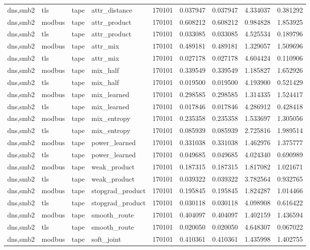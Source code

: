 \begin{tabular}{lllllllll}
dns,smb2 & tls & tape & attr\_distance & 170101 & 0.037947 & 0.037947 & 4.334037 & 0.381292 \\
dns,smb2 & modbus & tape & attr\_product & 170101 & 0.608212 & 0.608212 & 0.984828 & 1.853925 \\
dns,smb2 & tls & tape & attr\_product & 170101 & 0.033085 & 0.033085 & 4.525534 & 0.189796 \\
dns,smb2 & modbus & tape & attr\_mix & 170101 & 0.489181 & 0.489181 & 1.329057 & 1.509696 \\
dns,smb2 & tls & tape & attr\_mix & 170101 & 0.027178 & 0.027178 & 4.604424 & 0.110906 \\
dns,smb2 & modbus & tape & mix\_half & 170101 & 0.339549 & 0.339549 & 1.185827 & 1.652926 \\
dns,smb2 & tls & tape & mix\_half & 170101 & 0.019500 & 0.019500 & 4.193900 & 0.521429 \\
dns,smb2 & modbus & tape & mix\_learned & 170101 & 0.298585 & 0.298585 & 1.314335 & 1.524417 \\
dns,smb2 & tls & tape & mix\_learned & 170101 & 0.017846 & 0.017846 & 4.286912 & 0.428418 \\
dns,smb2 & modbus & tape & mix\_entropy & 170101 & 0.235358 & 0.235358 & 1.533697 & 1.305056 \\
dns,smb2 & tls & tape & mix\_entropy & 170101 & 0.085939 & 0.085939 & 2.725816 & 1.989514 \\
dns,smb2 & modbus & tape & power\_learned & 170101 & 0.331038 & 0.331038 & 1.462976 & 1.375777 \\
dns,smb2 & tls & tape & power\_learned & 170101 & 0.049685 & 0.049685 & 4.024340 & 0.690989 \\
dns,smb2 & modbus & tape & weak\_product & 170101 & 0.187315 & 0.187315 & 1.817082 & 1.021671 \\
dns,smb2 & tls & tape & weak\_product & 170101 & 0.039322 & 0.039322 & 3.782564 & 0.932765 \\
dns,smb2 & modbus & tape & stopgrad\_product & 170101 & 0.195845 & 0.195845 & 1.824287 & 1.014466 \\
dns,smb2 & tls & tape & stopgrad\_product & 170101 & 0.030118 & 0.030118 & 4.098908 & 0.616422 \\
dns,smb2 & modbus & tape & smooth\_route & 170101 & 0.404097 & 0.404097 & 1.402159 & 1.436594 \\
dns,smb2 & tls & tape & smooth\_route & 170101 & 0.020050 & 0.020050 & 4.648307 & 0.067022 \\
dns,smb2 & modbus & tape & soft\_joint & 170101 & 0.410361 & 0.410361 & 1.435998 & 1.402755 \\

\end{tabular}
